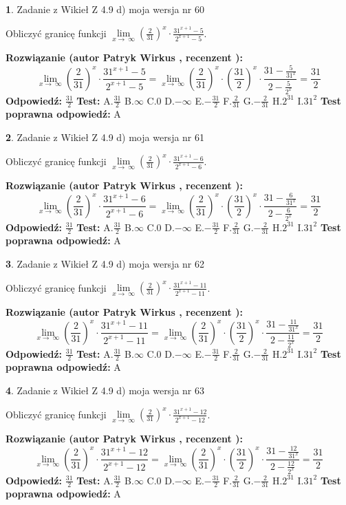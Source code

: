 \documentclass[12pt, a4paper]{article}
\theoremstyle{definition} %
\newtheorem{zad}{}
\newcommand{\zadStart}[1]{\begin{zad}#1\newline}
\newcommand{\zadStop}{\end{zad}}
\newcommand{\rozwStart}[2]{\noindent \textbf{Rozwiązanie (autor #1 , recenzent #2): }\newline}
\newcommand{\rozwStop}{\newline}
\newcommand{\odpStart}{\noindent \textbf{Odpowiedź:}\newline}
\newcommand{\odpStop}{\newline}
\newcommand{\testStart}{\noindent \textbf{Test:}\newline}
\newcommand{\testStop}{\newline}
\newcommand{\kluczStart}{\noindent \textbf{Test poprawna odpowiedź:}\newline}
\newcommand{\kluczStop}{\newline}
\begin{document}
\zadStart{Zadanie z Wikieł Z 4.9 d) moja wersja nr 60}


Obliczyć granicę funkcji  $\lim\limits_{x\to\ \infty}(\frac{2}{31})^{x}\cdot\frac{31^{x+1}-5}{2^{x+1}-5}$.
\zadStop
\rozwStart{Patryk Wirkus}{}
$$\lim\limits_{x\to\ \infty}(\frac{2}{31})^{x}\cdot\frac{31^{x+1}-5}{2^{x+1}-5}=\lim\limits_{x\to\ \infty}(\frac{2}{31})^{x}\cdot(\frac{31}{2})^{x} \cdot \frac{31-\frac{5}{31^{x}}}{2-\frac{5}{2^{x}}} = \frac{31}{2}$$
\rozwStop
\odpStart
$\frac{31}{2}$
\odpStop
\testStart
A.$\frac{31}{2}$ B.$\infty$ C.$0$ D.$-\infty$ E.$-\frac{31}{2}$
F.$\frac{2}{31}$ G.$-\frac{2}{31}$
H.$2^{31}$
I.$31^{2}$
\testStop
\kluczStart
A
\kluczStop



\zadStart{Zadanie z Wikieł Z 4.9 d) moja wersja nr 61}


Obliczyć granicę funkcji  $\lim\limits_{x\to\ \infty}(\frac{2}{31})^{x}\cdot\frac{31^{x+1}-6}{2^{x+1}-6}$.
\zadStop
\rozwStart{Patryk Wirkus}{}
$$\lim\limits_{x\to\ \infty}(\frac{2}{31})^{x}\cdot\frac{31^{x+1}-6}{2^{x+1}-6}=\lim\limits_{x\to\ \infty}(\frac{2}{31})^{x}\cdot(\frac{31}{2})^{x} \cdot \frac{31-\frac{6}{31^{x}}}{2-\frac{6}{2^{x}}} = \frac{31}{2}$$
\rozwStop
\odpStart
$\frac{31}{2}$
\odpStop
\testStart
A.$\frac{31}{2}$ B.$\infty$ C.$0$ D.$-\infty$ E.$-\frac{31}{2}$
F.$\frac{2}{31}$ G.$-\frac{2}{31}$
H.$2^{31}$
I.$31^{2}$
\testStop
\kluczStart
A
\kluczStop



\zadStart{Zadanie z Wikieł Z 4.9 d) moja wersja nr 62}


Obliczyć granicę funkcji  $\lim\limits_{x\to\ \infty}(\frac{2}{31})^{x}\cdot\frac{31^{x+1}-11}{2^{x+1}-11}$.
\zadStop
\rozwStart{Patryk Wirkus}{}
$$\lim\limits_{x\to\ \infty}(\frac{2}{31})^{x}\cdot\frac{31^{x+1}-11}{2^{x+1}-11}=\lim\limits_{x\to\ \infty}(\frac{2}{31})^{x}\cdot(\frac{31}{2})^{x} \cdot \frac{31-\frac{11}{31^{x}}}{2-\frac{11}{2^{x}}} = \frac{31}{2}$$
\rozwStop
\odpStart
$\frac{31}{2}$
\odpStop
\testStart
A.$\frac{31}{2}$ B.$\infty$ C.$0$ D.$-\infty$ E.$-\frac{31}{2}$
F.$\frac{2}{31}$ G.$-\frac{2}{31}$
H.$2^{31}$
I.$31^{2}$
\testStop
\kluczStart
A
\kluczStop



\zadStart{Zadanie z Wikieł Z 4.9 d) moja wersja nr 63}


Obliczyć granicę funkcji  $\lim\limits_{x\to\ \infty}(\frac{2}{31})^{x}\cdot\frac{31^{x+1}-12}{2^{x+1}-12}$.
\zadStop
\rozwStart{Patryk Wirkus}{}
$$\lim\limits_{x\to\ \infty}(\frac{2}{31})^{x}\cdot\frac{31^{x+1}-12}{2^{x+1}-12}=\lim\limits_{x\to\ \infty}(\frac{2}{31})^{x}\cdot(\frac{31}{2})^{x} \cdot \frac{31-\frac{12}{31^{x}}}{2-\frac{12}{2^{x}}} = \frac{31}{2}$$
\rozwStop
\odpStart
$\frac{31}{2}$
\odpStop
\testStart
A.$\frac{31}{2}$ B.$\infty$ C.$0$ D.$-\infty$ E.$-\frac{31}{2}$
F.$\frac{2}{31}$ G.$-\frac{2}{31}$
H.$2^{31}$
I.$31^{2}$
\testStop
\kluczStart
A
\kluczStop
\end{document}
